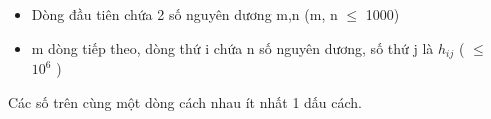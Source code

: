\begin{itemize}
	\item Dòng đầu tiên chứa 2 số nguyên dương m,n (m, n  $\le$ 1000)
	\item m dòng tiếp theo, dòng thứ i chứa n số nguyên dương, số thứ j là $h_{ij}$ ( $\le$ $10^{6}$ )
\end{itemize}

Các số trên cùng một dòng cách nhau ít nhất 1 dấu cách.